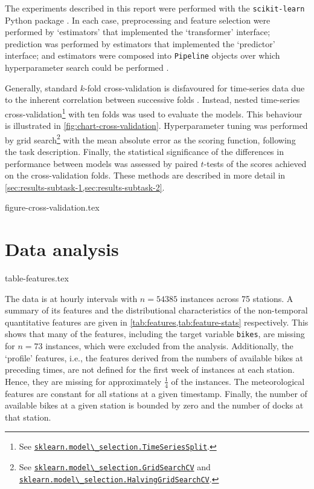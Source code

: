 \documentclass[11pt]{extarticle}
\newcommand{\sklearn}[2]{\href{https://scikit-learn.org/stable/modules/generated/sklearn.#1.#2.html}{\lstinline|sklearn.#1.#2|}}
\begin{document}
The experiments described in this report were performed with the \texttt{scikit-learn}
Python package \parencite{Pedregosa2011}.
In each case, preprocessing and feature selection were performed by `estimators' that
implemented the `transformer' interface; prediction was performed by estimators that
implemented the `predictor' interface; and estimators were composed into
\texttt{Pipeline} objects over which hyperparameter search could be performed
\parencite[4-9]{Buitinck2013}.

Generally, standard $k$-fold cross-validation is disfavoured for time-series data due
to the inherent correlation between successive folds \parencite{Bergmeir2018}.
Instead, nested time-series cross-validation\footnote{See
  \sklearn{model\_selection}{TimeSeriesSplit}.
} with ten folds
was used to evaluate the models.
This behaviour is illustrated in \cref{fig:chart-cross-validation}.
Hyperparameter tuning was performed by grid search\footnote{See
  \sklearn{model\_selection}{GridSearchCV} and
  \sklearn{model\_selection}{HalvingGridSearchCV}.
}
with the mean absolute error as the scoring function, following the task description.
Finally, the statistical significance of the differences in performance between models
was assessed by paired $t$-tests of the scores achieved on the cross-validation folds.
These methods are described in more detail in
\cref{sec:results-subtask-1,sec:results-subtask-2}.

{figure-cross-validation.tex}

\section{Data analysis}
\label{sec:data-analysis}

{table-features.tex}

The data is at hourly intervals with $n = 54385$ instances across 75 stations.
A summary of its features and the distributional characteristics of the non-temporal
quantitative features are given in \cref{tab:features,tab:feature-stats} respectively.
This shows that many of the features, including the target variable \texttt{bikes}, are
missing for $n = 73$ instances, which were excluded from the analysis.
Additionally, the `profile' features, i.e., the features derived from the numbers of
available bikes at preceding times, are not defined for the first week of instances at
each station.
Hence, they are missing for approximately $\frac{1}{4}$ of the instances.
The meteorological features are constant for all stations at a given timestamp.
Finally, the number of available bikes at a given station is bounded by zero and the
number of docks at that station.
\end{document}
